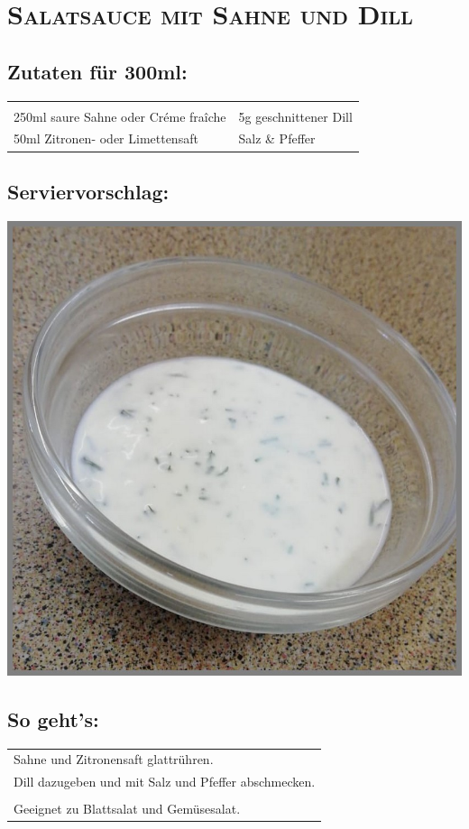 \section{\textsc{Salatsauce mit Sahne und Dill}}

\subsection*{Zutaten für 300ml:}

\begin{tabular}{p{7.5cm} p{7.5cm}}
	& \\
	250ml saure Sahne oder Créme fraîche & 5g geschnittener Dill\\
	50ml Zitronen- oder Limettensaft & Salz \& Pfeffer
\end{tabular}

\subsection*{Serviervorschlag:}

\includegraphics[width=\textwidth]{img/d_dillsahne.jpeg} \cite{dsahnedill}

\subsection*{So geht's:}

\begin{tabular}{p{15cm}}
	\\
	Sahne und Zitronensaft glattrühren.\\
	Dill dazugeben und mit Salz und Pfeffer abschmecken.\\
	\\
	Geeignet zu Blattsalat und Gemüsesalat.
\end{tabular}
